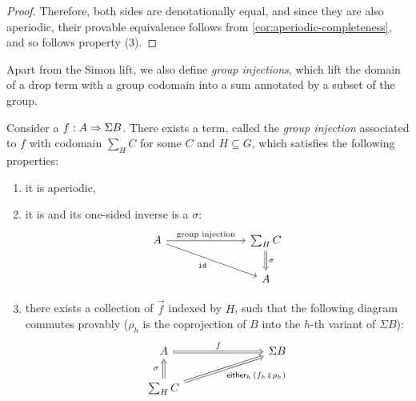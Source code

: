 \begin{proof}
    Therefore, both sides are denotationally equal, and since they are also aperiodic, their provable equivalence follows from \cref{cor:aperiodic-completeness}, and so follows property (3).
\end{proof}

Apart from the Simon lift, we also define \emph{group injections}, which lift the domain of a drop term with a group codomain into a sum annotated by a subset of the group.

\begin{lemma}\label{lem:group-injection}
    Consider a  $f : A \Rightarrow \Sigma B$. There exists a term, called the \emph{group injection} associated to $f$ with codomain $\sum_H C$ for some  $C$ and $H \subseteq G$, which satisfies the following properties:
    \begin{enumerate}
        \item it is aperiodic,
        \item it is  and its one-sided inverse is a  $\sigma$:
        \[
        \begin{tikzcd}[column sep=2.5cm]
            A
            \ar[r, "\text{group injection}"]
            \ar[dr, "\idterm"'{xshift=-0.5ex}]
            &\sum_H C
            \ar[d, \dropar, "\sigma"]
            \\
            &A
        \end{tikzcd}
        \]
        \item there exists a collection of  $\vec f$ indexed by $H$, such that the following diagram commutes provably ($\rho_h$ is the coprojection of $B$ into the $h$-th variant of $\Sigma B$):
        \[
        \begin{tikzcd}[column sep=2.5cm]
            A
            \ar[r, \dropar, "f"]
            &\Sigma B
            \\
            \sum_H C
            \ar[u, \dropar, "\sigma"{xshift=-0.5ex}]
            \ar[ur, \dropar, "\eithermany{h}{(f_h \comp \rho_h)}"']
        \end{tikzcd}
        \]
    \end{enumerate}
\end{lemma}
